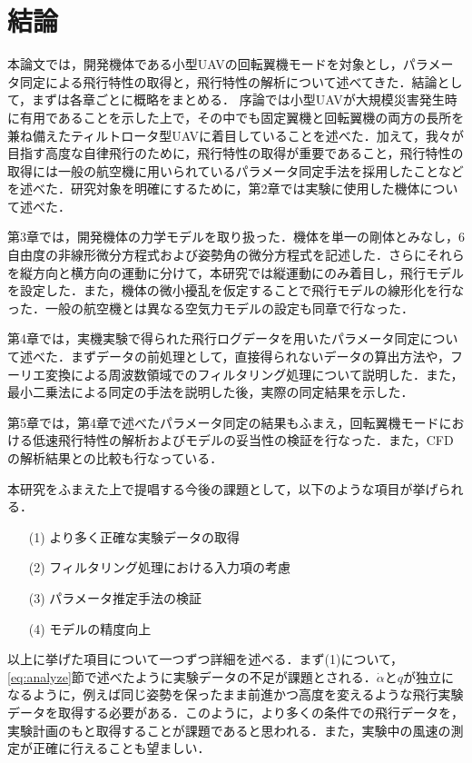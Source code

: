 
\chapter{結論}
\label{conclusion}

本論文では，開発機体である小型UAVの回転翼機モードを対象とし，パラメータ同定による飛行特性の取得と，飛行特性の解析について述べてきた．結論として，まずは各章ごとに概略をまとめる．
序論では小型UAVが大規模災害発生時に有用であることを示した上で，その中でも固定翼機と回転翼機の両方の長所を兼ね備えたティルトロータ型UAVに着目していることを述べた．加えて，我々が目指す高度な自律飛行のために，飛行特性の取得が重要であること，飛行特性の取得には一般の航空機に用いられているパラメータ同定手法を採用したことなどを述べた．研究対象を明確にするために，第2章では実験に使用した機体について述べた．

第3章では，開発機体の力学モデルを取り扱った．機体を単一の剛体とみなし，6自由度の非線形微分方程式および姿勢角の微分方程式を記述した．さらにそれらを縦方向と横方向の運動に分けて，本研究では縦運動にのみ着目し，飛行モデルを設定した．また，機体の微小擾乱を仮定することで飛行モデルの線形化を行なった．一般の航空機とは異なる空気力モデルの設定も同章で行なった．

第4章では，実機実験で得られた飛行ログデータを用いたパラメータ同定について述べた．まずデータの前処理として，直接得られないデータの算出方法や，フーリエ変換による周波数領域でのフィルタリング処理について説明した．また，最小二乗法による同定の手法を説明した後，実際の同定結果を示した．

第5章では，第4章で述べたパラメータ同定の結果もふまえ，回転翼機モードにおける低速飛行特性の解析およびモデルの妥当性の検証を行なった．また，CFDの解析結果との比較も行なっている．

\vspace{5pt}

本研究をふまえた上で提唱する今後の課題として，以下のような項目が挙げられる．
\begin{itemize}
  \item[(1)] より多く正確な実験データの取得
  \item[(2)] フィルタリング処理における入力項の考慮
  \item[(3)] パラメータ推定手法の検証
  \item[(4)] モデルの精度向上
\end{itemize}

以上に挙げた項目について一つずつ詳細を述べる．まず(1)について，\ref{eq:analyze}節で述べたように実験データの不足が課題とされる．$\dot{\alpha}$と$q$が独立になるように，例えば同じ姿勢を保ったまま前進かつ高度を変えるような飛行実験データを取得する必要がある．このように，より多くの条件での飛行データを，実験計画のもと取得することが課題であると思われる．また，実験中の風速の測定が正確に行えることも望ましい．

